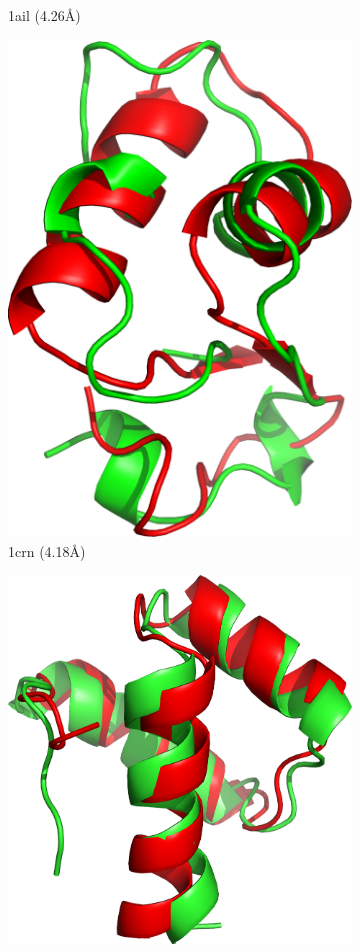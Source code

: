 \begin{figure}
\begin{subfigure}{0.24\linewidth}
    \caption{1ail (4.26\AA)}
    \label{fig:1ail-conformation}
  \end{subfigure}
%
  \begin{subfigure}{0.24\linewidth}
    \centering
    \includegraphics[width=0.9\linewidth]{Figuras/prots/1crn_render.png}
    \caption{1crn (4.18\AA)}
    \label{fig:1crn-conformation}
  \end{subfigure}
%
  \begin{subfigure}{0.24\linewidth}
    \centering
    \includegraphics[width=0.9\linewidth]{Figuras/prots/1enh_render.png}

\end{subfigure}
\end{figure}
